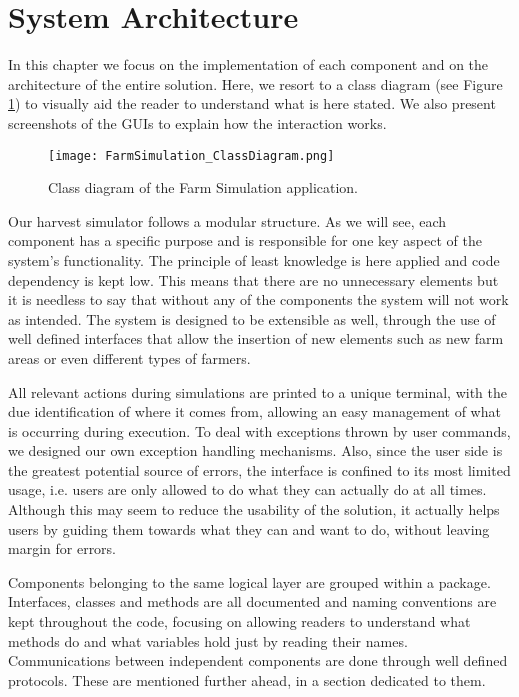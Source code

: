 \documentclass[12pt]{article}
\begin{document}
\newpage
\section{System Architecture} %

In this chapter we focus on the implementation of each component and on the architecture of the entire solution.
Here, we resort to a class diagram (see Figure \ref{class_diagram}) to visually aid the reader to understand what is here stated.
We also present screenshots of the GUIs to explain how the interaction works.

\begin{figure}[H]
  \centering
  \begin{minipage}{\textwidth}
    \centering
    \texttt{[image: FarmSimulation\_ClassDiagram.png]}
  \end{minipage}%
  \caption{Class diagram of the Farm Simulation application.}
  \label{class_diagram}
\end{figure}

Our harvest simulator follows a modular structure.
As we will see, each component has a specific purpose and is responsible for one key aspect of the system's functionality.
The principle of least knowledge is here applied and code dependency is kept low.
This means that there are no unnecessary elements but it is needless to say that without any of the components the system will not work as intended.
The system is designed to be extensible as well, through the use of well defined interfaces that allow the insertion of new elements such as new farm areas or 
even different types of farmers.

All relevant actions during simulations are printed to a unique terminal, with the due identification of where it comes from, allowing an easy management of 
what is occurring during execution.
To deal with exceptions thrown by user commands, we designed our own exception handling mechanisms.
Also, since the user side is the greatest potential source of errors, the interface is confined to its most limited usage, i.e. users are only allowed to do 
what they can actually do at all times.
Although this may seem to reduce the usability of the solution, it actually helps users by guiding them towards what they can and want to do, without leaving 
margin for errors.

Components belonging to the same logical layer are grouped within a package.
Interfaces, classes and methods are all documented and naming conventions are kept throughout the code, focusing on allowing readers to understand what methods 
do and what variables hold just by reading their names.
Communications between independent components are done through well defined protocols.
These are mentioned further ahead, in a section dedicated to them.
\end{document}
